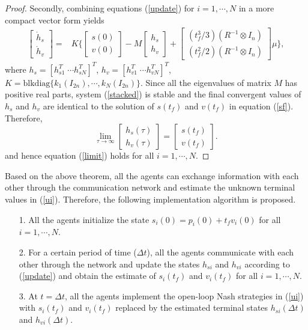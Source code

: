 \documentclass[letterpaper, 10 pt, conference,onecolumn]{ieeeconf}  %
\begin{document}
\begin{proof}
Secondly, combining equations (\ref{update}) for $i=1,\cdots,N$ in a more compact vector form yields
{\begin{align}
\begin{bmatrix}
\dot{h}_s\\
\dot{h}_v
\end{bmatrix}=&K\bigg\{\begin{bmatrix}
s(0)\\
v(0)
\end{bmatrix}-M\begin{bmatrix}
h_s\\
h_v
\end{bmatrix}+\begin{bmatrix}
(t_f^3/3)(R^{-1}\otimes I_n)\\
(t_f^2/2)(R^{-1}\otimes I_n)
\end{bmatrix}\mu\bigg\},\label{stacked}
\end{align}}
where $h_s=[h_{s1}^T\;\cdots h_{sN}^T]^T$, $h_v=[h_{v1}^T\;\cdots h_{vN}^T]^T$, {$K=\mbox{blkdiag}\{k_1(I_{2n}),\cdots,k_N(I_{2n})\}$}. Since all the eigenvalues of matrix $M$ has positive real parts, system (\ref{stacked}) is stable and the final convergent values of $h_s$ and $h_v$ are identical to the solution of $s(t_f)$ and $v(t_f)$ in equation (\ref{sf}). Therefore,
\[\lim_{\tau\rightarrow\infty}\begin{bmatrix}
h_s(\tau)\\
h_v(\tau)
\end{bmatrix}=\begin{bmatrix}
s(t_f)\\
v(t_f)
\end{bmatrix}.\]
and hence equation (\ref{limit}) holds for all $i=1,\cdots,N$.
\end{proof}

Based on the above theorem, all the agents can exchange information with each other through the communication network and estimate the unknown terminal values in (\ref{ui}). Therefore, the following implementation algorithm is proposed.
\begin{Alg}\label{Alg}
\quad
\begin{itemize}
\item[1.] All the agents initialize the state {$s_{i}(0)=p_i(0)+t_fv_i(0)$} for all $i=1,\cdots,N$.
\item[2.] For a certain period of time ($\Delta t$), all the agents communicate with each other through the network and update the states $h_{si}$ and $h_{vi}$ according to (\ref{update}) and obtain the estimate of $s_{i}(t_f)$ and $v_i(t_f)$ for all $i=1,\cdots,N$.
\item[3.] At $t=\Delta t$, all the agents implement the {open-loop Nash} strategies in (\ref{ui}) with $s_i(t_f)$ and $v_i(t_f)$ replaced by the estimated terminal states $h_{si}(\Delta t)$ and $h_{vi}(\Delta t)$.
\end{itemize}
\end{Alg}
\end{document}
